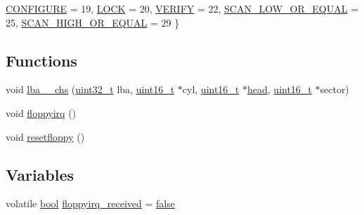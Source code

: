 \begin{DoxyCompactItemize}
\hyperlink{a00029_a9990a5de334fdaec2ce93b74b8676148_a9990a5de334fdaec2ce93b74b8676148a5183723f609e1521f38450e9792af61d}{C\+O\+N\+F\+I\+G\+U\+RE} = 19, 
\hyperlink{a00029_a9990a5de334fdaec2ce93b74b8676148_a9990a5de334fdaec2ce93b74b8676148a438b68412f24003b09e0993b62dc7b48}{L\+O\+CK} = 20, 
\hyperlink{a00029_a9990a5de334fdaec2ce93b74b8676148_a9990a5de334fdaec2ce93b74b8676148a570b000ad5bd233482644aaaac095680}{V\+E\+R\+I\+FY} = 22, 
\hyperlink{a00029_a9990a5de334fdaec2ce93b74b8676148_a9990a5de334fdaec2ce93b74b8676148a7eefaec5fabe1db94fd12a84af66b6cd}{S\+C\+A\+N\+\_\+\+L\+O\+W\+\_\+\+O\+R\+\_\+\+E\+Q\+U\+AL} = 25, 
\newline
\hyperlink{a00029_a9990a5de334fdaec2ce93b74b8676148_a9990a5de334fdaec2ce93b74b8676148a1ee024a89ac2dbd7845f63306f175546}{S\+C\+A\+N\+\_\+\+H\+I\+G\+H\+\_\+\+O\+R\+\_\+\+E\+Q\+U\+AL} = 29
 \}
\end{DoxyCompactItemize}
\subsection*{Functions}
\begin{DoxyCompactItemize}
\item 
void \hyperlink{a00029_a782ff57a4ec7786197ec3a12d4f52332_a782ff57a4ec7786197ec3a12d4f52332}{lba\+\_\+\_\+chs} (\hyperlink{a00134_a435d1572bf3f880d55459d9805097f62_a435d1572bf3f880d55459d9805097f62}{uint32\+\_\+t} lba, \hyperlink{a00134_a273cf69d639a59973b6019625df33e30_a273cf69d639a59973b6019625df33e30}{uint16\+\_\+t} $\ast$cyl, \hyperlink{a00134_a273cf69d639a59973b6019625df33e30_a273cf69d639a59973b6019625df33e30}{uint16\+\_\+t} $\ast$\hyperlink{a00161_ac630e1c7e5feeaaf43837648134a0c6d_ac630e1c7e5feeaaf43837648134a0c6d}{head}, \hyperlink{a00134_a273cf69d639a59973b6019625df33e30_a273cf69d639a59973b6019625df33e30}{uint16\+\_\+t} $\ast$sector)
\item 
void \hyperlink{a00029_acbe17688655526c3fa02f324ae8336ca_acbe17688655526c3fa02f324ae8336ca}{floppyirq} ()
\item 
void \hyperlink{a00029_ad64d38a767bc5f30a3e13a5b01b9cf35_ad64d38a767bc5f30a3e13a5b01b9cf35}{resetfloppy} ()
\end{DoxyCompactItemize}
\subsection*{Variables}
\begin{DoxyCompactItemize}
\item 
volatile \hyperlink{a00134_af6a258d8f3ee5206d682d799316314b1_af6a258d8f3ee5206d682d799316314b1}{bool} \hyperlink{a00029_a2cfa75d25a7da8cb54551c7840e80d40_a2cfa75d25a7da8cb54551c7840e80d40}{floppyirq\+\_\+received} = \hyperlink{a00134_af6a258d8f3ee5206d682d799316314b1_af6a258d8f3ee5206d682d799316314b1ae9de385ef6fe9bf3360d1038396b884c}{false}
\end{DoxyCompactItemize}



